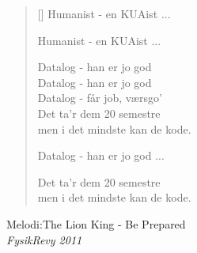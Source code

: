 \begin{multicols}
\begin{verse}[\versewidth]
Humanist - en KUAist ...

Humanist - en KUAist ...

Datalog - han er jo god\\
Datalog - han er jo god\\
Datalog - får job, værsgo'\\
Det ta'r dem 20 semestre\\
men i det mindste kan de kode.

Datalog - han er jo god ...

Det ta'r dem 20 semestre\\
men i det mindste kan de kode.
\end{verse}
\end{multicols}
\newpage

{Melodi:The Lion King - Be Prepared}\\[.2em]
{\small\itshape FysikRevy 2011}
